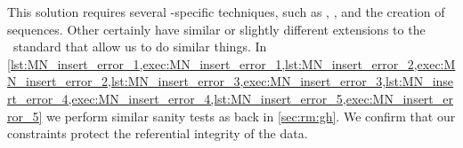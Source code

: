 This solution requires several \postgresql-specific techniques, such as , , and the creation of sequences.
Other  certainly have similar or slightly different extensions to the \sql\ standard that allow us to do similar things.
In \cref{lst:MN_insert_error_1,exec:MN_insert_error_1,lst:MN_insert_error_2,exec:MN_insert_error_2,lst:MN_insert_error_3,exec:MN_insert_error_3,lst:MN_insert_error_4,exec:MN_insert_error_4,lst:MN_insert_error_5,exec:MN_insert_error_5} we perform similar sanity tests as back in \cref{sec:rm:gh}.
We confirm that our constraints protect the referential integrity of the data.%
%
\FloatBarrier%
\endhsection%
%
